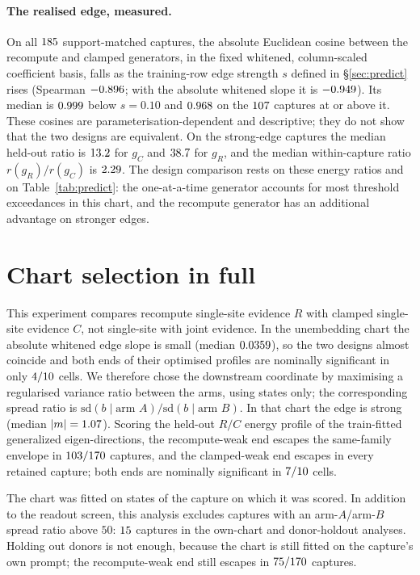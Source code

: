 \paragraph{The realised edge, measured.} On all $185$ support-matched captures, the absolute Euclidean cosine between the
recompute and clamped generators, in the fixed whitened, column-scaled coefficient basis, falls as the training-row edge strength
$s$ defined in \S\ref{sec:predict} rises (Spearman $-0.896$; with the absolute whitened slope it is $-0.949$). Its median is
$0.999$ below $s=0.10$ and $0.968$ on the $107$ captures at or above it. These cosines are
parameterisation-dependent and descriptive; they do not show that the two designs are equivalent. On the
strong-edge captures the median held-out ratio is $13.2$ for $g_C$ and $38.7$ for $g_R$, and
the median within-capture ratio $r(g_R)/r(g_C)$ is $2.29$. The design comparison rests on these energy
ratios and on Table~\ref{tab:predict}: the one-at-a-time generator accounts for most threshold exceedances in this
chart, and the recompute generator has an additional advantage on stronger edges.

\clearpage
\section{Chart selection in full}
\label{app:chart}

This experiment compares recompute single-site evidence $R$ with clamped single-site evidence $C$, not single-site
with joint evidence. In the unembedding chart the absolute whitened edge slope is small (median $0.0359$), so the
two designs almost coincide and both ends of their optimised profiles are nominally significant in only
$4/10$ cells. We therefore chose the
downstream coordinate by maximising a regularised variance ratio between the arms, using states only; the corresponding
spread ratio is $\mathrm{sd}(b\mid\text{arm }A)/\mathrm{sd}(b\mid\text{arm }B)$. In that chart the edge is strong (median $|m|=1.07$). Scoring the held-out $R/C$ energy profile of the
train-fitted generalized eigen-directions, the recompute-weak end escapes the same-family envelope in $103/170$
captures, and the clamped-weak end escapes in every retained capture; both ends are nominally significant in
$7/10$ cells.

The chart was fitted on states of the capture on which it was scored. In addition to the readout screen,
this analysis excludes captures with an arm-$A$/arm-$B$ spread ratio above $50$: $15$ captures in the
own-chart and donor-holdout analyses. Holding out donors is not enough, because the chart is still fitted on the
capture's own prompt; the recompute-weak end still escapes in $75/170$ captures.

